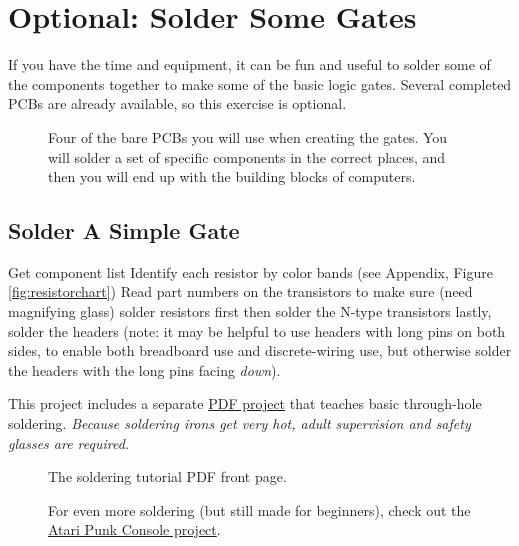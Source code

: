 \section{Optional: Solder Some Gates}

If you have the time and equipment, it can be fun and useful to solder some of the components together to make some of the basic logic gates. Several completed PCBs are already available, so this exercise is optional. %

\begin{figure}[ht!]
\begin{center}
\end{center}
\caption{Four of the bare PCBs you will use when creating the gates. You will solder a set of specific components in the correct places, and then you will end up with the building blocks of computers.}
\label{fig:barepcbs}
\end{figure}

\subsection*{Solder A Simple Gate}

\bi

\+ Get component list 
\+ Identify each resistor by color bands (see Appendix, Figure \ref{fig:resistorchart})
\+ Read part numbers on the transistors to make sure (need magnifying glass)
\+ solder resistors first
\+ then solder the N-type transistors 
\+ lastly, solder the headers (note: it may be helpful to use headers with long pins on both sides, to enable both breadboard use and discrete-wiring use, but otherwise solder the headers with the long pins facing \emph{down}).

\ei

This project includes a separate {\color{webblue}\href{https://github.com/jessehamner/TechMillForKids/tree/master/soldering}{PDF project}} that teaches basic through-hole soldering. \emph{Because soldering irons get very hot, adult supervision and safety glasses are required.}

\begin{figure}[hb!]
\begin{center}
\end{center}
\caption{The soldering tutorial PDF front page.}
\label{fig:soldering}
\end{figure}

\begin{figure}[hb!]
\begin{center}
\end{center}
\caption{For even more soldering (but still made for beginners), check out the {\color{webblue}\href{https://github.com/jessehamner/AtariPunkConsole}{Atari Punk Console project}}.}
\label{fig:soldering}
\end{figure} 

\clearpage